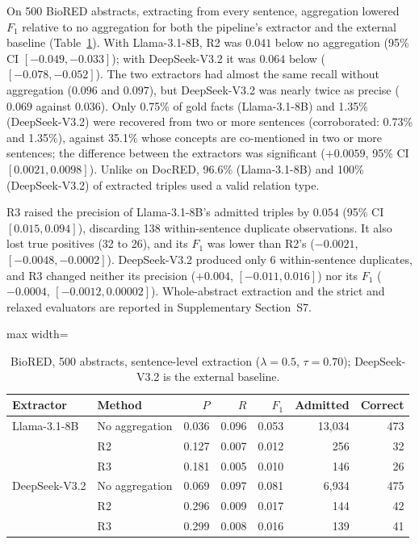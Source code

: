 \documentclass[11pt]{article}
\begin{document}
On 500 BioRED abstracts, extracting from every sentence, aggregation
lowered $F_1$ relative to no aggregation for both the pipeline's
extractor and the external baseline (Table~\ref{tab:biored-results}).
With Llama-3.1-8B, R2 was $0.041$ below no aggregation (95\% CI
$[-0.049, -0.033]$); with DeepSeek-V3.2 it was $0.064$ below
($[-0.078, -0.052]$). The two extractors had almost the same recall
without aggregation ($0.096$ and $0.097$), but DeepSeek-V3.2 was nearly
twice as precise ($0.069$ against $0.036$). Only 0.75\% of gold facts
(Llama-3.1-8B) and 1.35\% (DeepSeek-V3.2) were recovered from two or more
sentences (corroborated: 0.73\% and 1.35\%), against 35.1\% whose concepts are co-mentioned in two or more
sentences; the difference between the extractors was significant
($+0.0059$, 95\% CI $[0.0021, 0.0098]$). Unlike on DocRED, 96.6\%
(Llama-3.1-8B) and 100\% (DeepSeek-V3.2) of extracted triples used a
valid relation type.

R3 raised the precision of Llama-3.1-8B's admitted triples by $0.054$
(95\% CI $[0.015, 0.094]$), discarding 138 within-sentence duplicate
observations. It also lost true positives (32 to 26), and its $F_1$ was
lower than R2's ($-0.0021$, $[-0.0048, -0.0002]$). DeepSeek-V3.2 produced
only 6 within-sentence duplicates, and R3 changed neither its precision
($+0.004$, $[-0.011, 0.016]$) nor its $F_1$ ($-0.0004$,
$[-0.0012, 0.00002]$). Whole-abstract extraction and the strict and
relaxed evaluators are reported in Supplementary Section~S7.

\begin{table}[htbp]
\centering
\caption{BioRED, 500 abstracts, sentence-level extraction
($\lambda=0.5$, $\tau=0.70$); DeepSeek-V3.2 is the external baseline.}
\label{tab:biored-results}
\begin{adjustbox}{max width=\textwidth}
\begin{tabular}{@{}llrrrrr@{}}
\toprule
Extractor & Method & $P$ & $R$ & $F_1$ & Admitted & Correct \\
\midrule
Llama-3.1-8B & No aggregation & 0.036 & 0.096 & 0.053 & 13,034 & 473 \\
 & R2 & 0.127 & 0.007 & 0.012 & 256 & 32 \\
 & R3 & 0.181 & 0.005 & 0.010 & 146 & 26 \\
DeepSeek-V3.2 & No aggregation & 0.069 & 0.097 & 0.081 & 6,934 & 475 \\
 & R2 & 0.296 & 0.009 & 0.017 & 144 & 42 \\
 & R3 & 0.299 & 0.008 & 0.016 & 139 & 41 \\
\bottomrule
\end{tabular}
\end{adjustbox}
\end{table}
\end{document}
